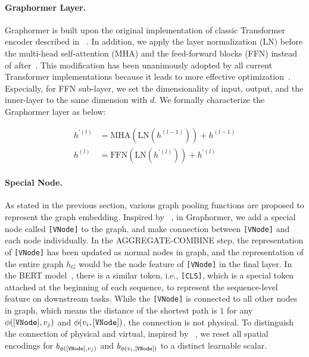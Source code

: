 \documentclass{article}
\begin{document}
\paragraph{Graphormer Layer.} Graphormer is built upon the original implementation of classic Transformer encoder described in ~\cite{vaswani2017attention}. In addition, we apply the layer normalization (LN) before the multi-head self-attention (MHA) and the feed-forward blocks (FFN) instead of after~\cite{xiong2020layer}. This modification has been unanimously adopted by all current Transformer implementations because it leads to more effective optimization~\cite{narang2021transformer}. Especially, for FFN sub-layer, we set the dimensionality of input, output, and the inner-layer to the same dimension with $d$. We formally characterize the Graphormer layer as below:

\begin{align}
    h^{'(l)} &= \text{MHA}(\text{LN}(h^{(l-1)})) + h^{(l-1)}\\
    h^{(l)} &= \text{FFN}(\text{LN}(h^{'(l)})) + h^{'(l)}
\end{align}


\paragraph{Special Node.} As stated in the previous section, various graph pooling functions are proposed to represent the graph embedding. Inspired by ~\cite{gilmer2017neural}, in Graphormer, we add a special node called {\tt[VNode]} to the graph, and make connection between {\tt[VNode]} and each node individually. In the AGGREGATE-COMBINE step, the representation of {\tt[VNode]} has been updated as normal nodes in graph, and the representation of the entire graph $h_G$ would be the node feature of {\tt[VNode]} in the final layer. In the BERT model~\cite{devlin2019bert,liu2019roberta}, there is a similar token, i.e., {\tt[CLS]}, which is a special token attached at the beginning of each sequence, to represent the sequence-level feature on downstream tasks. While the {\tt[VNode]} is connected to all other nodes in graph, which means the distance of the shortest path is $1$ for any $\phi({\tt[VNode]}, v_j)$ and $\phi(v_i, {\tt[VNode]})$, the connection is not physical. To distinguish the connection of physical and virtual, inspired by ~\cite{ke2020rethinking}, we reset all spatial encodings for $b_{\phi({\tt[VNode]}, v_j)}$ and $b_{\phi(v_i, {\tt[VNode]})}$ to a distinct learnable scalar.
\end{document}
